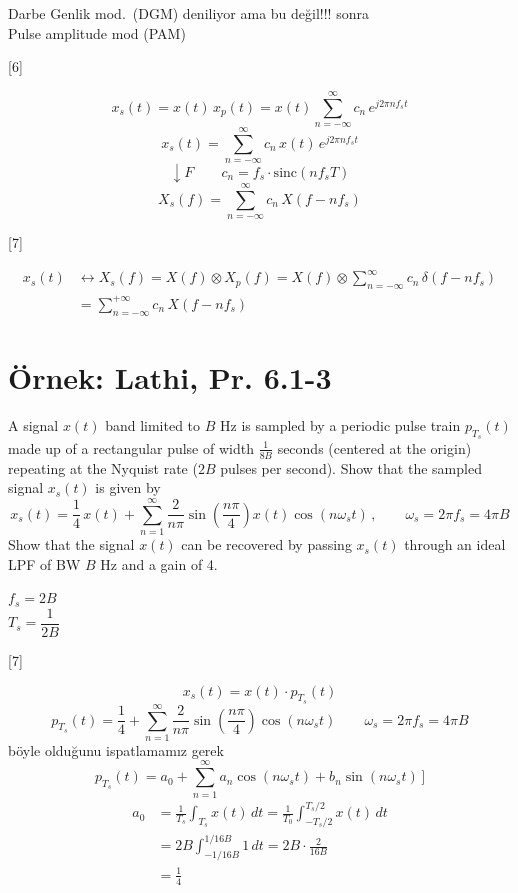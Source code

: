 \documentclass[11pt,a4paper]{article}
\begin{document}
\noindent Darbe Genlik mod.\ (DGM) deniliyor ama bu değil!!! sonra \\
Pulse amplitude mod (PAM)

[6]

\[ x_s(t)=x(t)\,x_p(t)=x(t)\sum_{n=-\infty}^{\infty}c_n\,e^{j2\pi nf_st} \]
\[ x_s(t)=\sum_{n=-\infty}^{\infty}c_n\,x(t)\,e^{j2\pi nf_st} \]
\[ \downarrow F \qquad c_n=f_s\cdot\mathrm{sinc}(nf_sT) \]
\[ X_s(f)=\sum_{n=-\infty}^{\infty}c_n\,X(f-nf_s) \]

[7]

\begin{align*}
x_s(t) &\longleftrightarrow X_s(f)=X(f)\otimes X_p(f)=X(f)\otimes\sum_{n=-\infty}^{\infty}c_n\,\delta(f-nf_s)\\
&=\sum_{n=-\infty}^{+\infty}c_n\,X(f-nf_s)
\end{align*}

\section{Örnek: Lathi, Pr. 6.1-3}
\noindent A signal $x(t)$ band limited to $B$ Hz is sampled by a periodic pulse train $p_{T_s}(t)$ made up of a rectangular pulse of width $\frac{1}{8B}$ seconds (centered at the origin) repeating at the Nyquist rate ($2B$ pulses per second). Show that the sampled signal $x_s(t)$ is given by
\[ x_s(t)=\frac{1}{4}\,x(t)+\sum_{n=1}^{\infty}\frac{2}{n\pi}\sin\!\left(\frac{n\pi}{4}\right)x(t)\cos(n\omega_st)\,,\qquad \omega_s=2\pi f_s=4\pi B \]
\noindent Show that the signal $x(t)$ can be recovered by passing $x_s(t)$ through an ideal LPF of BW $B$ Hz and a gain of 4.

\noindent \okunamadi{}

\noindent $f_s=2B$ \\ $T_s=\dfrac{1}{2B}$

[7]

\[ x_s(t)=x(t)\cdot p_{T_s}(t) \]
\[ p_{T_s}(t)=\frac{1}{4}+\sum_{n=1}^{\infty}\frac{2}{n\pi}\sin\!\left(\frac{n\pi}{4}\right)\cos(n\omega_st)\qquad \omega_s=2\pi f_s=4\pi B \]
\noindent böyle olduğunu ispatlamamız gerek
\[ p_{T_s}(t)=a_0+\sum_{n=1}^{\infty}a_n\cos(n\omega_st)+b_n\sin(n\omega_st)\,] \]
\begin{align*}
a_0 &= \frac{1}{T_s}\int_{T_s}x(t)\,dt=\frac{1}{T_0}\int_{-T_s/2}^{T_s/2}x(t)\,dt\\
&= 2B\int_{-1/16B}^{1/16B}1\,dt=2B\cdot\frac{2}{16B}\\
&= \frac{1}{4}
\end{align*}
\end{document}
